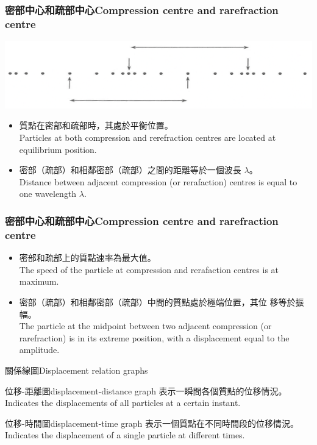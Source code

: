 \documentclass[beamer=true]{standalone}
\begin{document}
\begin{frame}
    \frametitle{密部中心和疏部中心Compression centre and rarefraction centre}
    \bigskip
    \par{\par\centering\includegraphics[width=.8\textwidth]{./img/ch1_2024-05-09-11-45-52.png}\par}
    \bigskip \bigskip

    \begin{itemize}
        \item 質點在密部和疏部時，其處於平衡位置。\\Particles at both compression and rerefraction centres are located at equilibrium position.
        \item 密部（疏部）和相鄰密部（疏部）之間的距離等於一個波長 $\lambda$。\\Distance between adjacent compression (or rerafaction) centres is equal to one wavelength $\lambda$.

    \end{itemize}
\end{frame}





\begin{frame}
    \frametitle{密部中心和疏部中心Compression centre and rarefraction centre}
    \begin{itemize}
        \item 密部和疏部上的質點速率為最大值。\\The speed of the particle at compression and rerafaction centres is at maximum.
        \item 密部（疏部）和相鄰密部（疏部）中間的質點處於極端位置，其位
              移等於振幅。\\The particle at the midpoint between two adjacent compression (or rarefraction) is in its extreme position, with a displacement equal to the amplitude.
    \end{itemize}
\end{frame}

\begin{frame}{關係線圖Displacement relation graphs}
    \begin{block}{位移-距離圖displacement-distance graph}
        表示一瞬間各個質點的位移情況。\\Indicates the displacements of all particles at a certain instant.
    \end{block}\bigskip
    \begin{block}{位移-時間圖displacement-time graph}
        表示一個質點在不同時間段的位移情況。\\Indicates the displacement of a single particle at different times.
    \end{block}
\end{frame}
\end{document}
